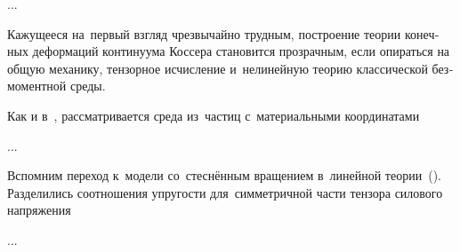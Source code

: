 \begin{otherlanguage}{russian}
...





Кажущееся на~первый взгляд чрезвычайно трудным, построение теории конечных деформаций континуума Коссера становится прозрачным, если опираться на общую механику, тензорное исчисление и~нелинейную теорию классической безмоментной среды.

Как и в~, рассматривается среда из~частиц с~материальными координатами

...





\label{para:caseoflatenttrihedron.largedisplacementsandrotations}

Вспомним переход к~модели со~стеснённым вращением в~линейной теории~(). Разделились соотношения упругости для~симметричной части тензора силового напряжения

...




\end{otherlanguage}

\section*{\small \wordforbibliography}


